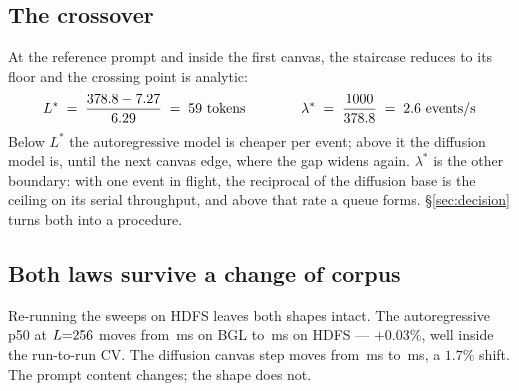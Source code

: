 \subsection{The crossover}

At the reference prompt and inside the first canvas, the staircase reduces to
its floor and the crossing point is analytic:
\begin{equation}
\label{eq:lcross}
L^{*} \;=\; \frac{\dgBase - \arBase}{\arSlope} \;=\; \crossoverL \ \text{tokens}
\qquad\qquad
\lambda^{*} \;=\; \frac{1000}{\dgBase} \;=\; \crossoverLambda \ \text{events/s}
\end{equation}
Below $L^{*}$ the autoregressive model is cheaper per event; above it the
diffusion model is, until the next canvas edge, where the gap widens again.
$\lambda^{*}$ is the other boundary: with one event in flight, the reciprocal
of the diffusion base is the ceiling on its serial throughput, and above that
rate a queue forms. \S\ref{sec:decision} turns both into a procedure.

\subsection{Both laws survive a change of corpus}

Re-running the sweeps on HDFS leaves both shapes intact. The autoregressive
p50 at $L{=}256$ moves from \arBgl\,ms on BGL to \arHdfs\,ms on HDFS
--- $+0.03\%$, well inside the run-to-run CV. The diffusion canvas step moves
from \bglStep\,ms to \hdfsStep\,ms, a $1.7\%$ shift. The prompt content
changes; the shape does not.

